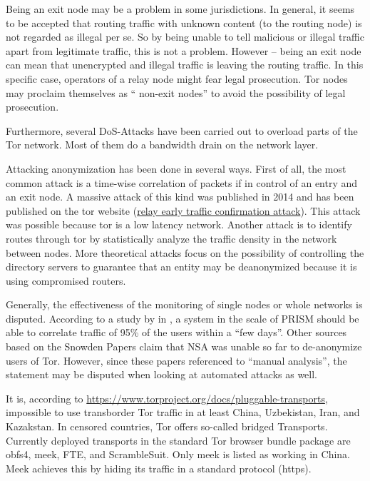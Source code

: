 Being an exit node may be a problem in some jurisdictions. In general, it seems to be accepted that routing traffic with unknown content (to the routing node) is not regarded as illegal per se. So by being unable to tell malicious or illegal traffic apart from legitimate traffic, this is not a problem. However -- being an exit node can mean that unencrypted and illegal traffic is leaving the routing traffic. In this specific case, operators of a relay node might fear legal prosecution. Tor nodes may proclaim themselves as  `` non-exit nodes''  to avoid the possibility of legal prosecution.

Furthermore, several DoS-Attacks have been carried out to overload parts of the Tor network. Most of them do a bandwidth drain on the network layer.

Attacking anonymization has been done in several ways. First of all, the most common attack is a time-wise correlation of packets if in control of an entry and an exit node. A massive attack of this kind was published in 2014 and has been published on the tor website (\href{https://blog.torproject.org/blog/tor-security-advisory-relay-early-traffic-confirmation-attack}{relay early traffic confirmation attack}). This attack was possible because tor is a low latency network. Another attack is to identify routes through tor by statistically analyze the traffic density in the network between nodes. More theoretical attacks focus on the possibility of controlling the directory servers to guarantee that an entity may be deanonymized because it is using compromised routers.

Generally, the effectiveness of the monitoring of single nodes or whole networks is disputed. According to a study by \citeauthor{ccs2013-usersrouted} in \citeyear{ccs2013-usersrouted}\cite{ccs2013-usersrouted}, a system in the scale of PRISM should be able to correlate traffic of 95\% of the users within a ``few days''. Other sources based on the Snowden Papers claim that NSA was unable so far to de-anonymize users of  Tor. However, since these papers referenced to ``manual analysis'', the statement may be disputed when looking at automated attacks as well.

It is, according to \url{https://www.torproject.org/docs/pluggable-transports}, impossible to use transborder Tor traffic in at least China, Uzbekistan, Iran, and Kazakstan. In censored countries, Tor offers so-called bridged Transports. Currently deployed transports in the standard Tor browser bundle package are obfs4, meek, FTE, and ScrambleSuit. Only meek is listed as working in China. Meek achieves this by hiding its traffic in a standard protocol (https).

